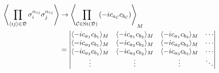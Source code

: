 \begin{align}\label{eq:multi-correlation}
    \left\langle \prod_{\langle ij \rangle\in\mathfrak{D}}
    \sigma_{i}^{\alpha_{ij}}\sigma_{j}^{\alpha_{ij}} \right\rangle
    &\to
    \left\langle 
    \prod_{\mathcal{C} \in \mathrm{St}(\mathfrak{D})} 
        \left( -i c_{a_{\mathcal{C}}}c_{b_{\mathcal{C}}}  \right)
     \right\rangle_M \nonumber \\
    &=
    \begin{vmatrix}
        \langle -ic_{a_1}c_{b_1} \rangle_M & \langle -ic_{a_1}c_{b_2} \rangle_M & \langle -ic_{a_1}c_{b_3} \rangle_M & \cdots \\
        \langle -ic_{a_2}c_{b_1} \rangle_M & \langle -ic_{a_2}c_{b_2} \rangle_M & \langle -ic_{a_2}c_{b_3} \rangle_M & \cdots \\
        \langle -ic_{a_3}c_{b_1} \rangle_M & \langle -ic_{a_3}c_{b_2} \rangle_M & \langle -ic_{a_3}c_{b_3} \rangle_M & \cdots \\
        \vdots & \vdots & \vdots & \ddots
    \end{vmatrix}
\end{align}


